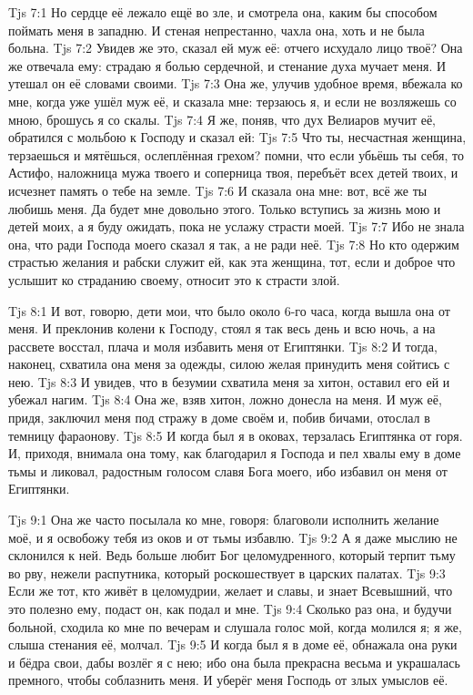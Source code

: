 \vs Tjs 7:1
Но сердце её лежало ещё во зле, и смотрела она,
каким бы способом поймать меня в западню.
И стеная непрестанно, чахла она,
хоть и не была больна.
\vs Tjs 7:2
Увидев же это, сказал ей муж её:
отчего исхудало лицо твоё?
Она же отвечала ему:
страдаю я болью сердечной, и стенание духа мучает меня.
И утешал он её словами своими.
\vs Tjs 7:3
Она же, улучив удобное время, вбежала ко мне,
когда уже ушёл муж её, и сказала мне:
терзаюсь я, и если не возляжешь со мною, брошусь я со скалы.
\vs Tjs 7:4
Я же, поняв, что дух Велиаров мучит её,
обратился с мольбою к Господу и сказал ей:
\vs Tjs 7:5
Что ты, несчастная женщина, терзаешься и мятёшься,
ослеплённая грехом?
помни, что если убьёшь ты себя,
то Астифо, наложница мужа твоего и соперница твоя,
перебъёт всех детей твоих,
и исчезнет память о тебе на земле.
\vs Tjs 7:6
И сказала она мне: вот, всё же ты любишь меня.
Да будет мне довольно этого.
Только вступись за жизнь мою и детей моих,
а я буду ожидать, пока не услажу страсти моей.
\vs Tjs 7:7
Ибо не знала она, что ради Господа моего сказал я так,
а не ради неё.
\vs Tjs 7:8
Но кто одержим страстью желания и рабски служит ей,
как эта женщина, тот, если и доброе что услышит
ко страданию своему, относит это к страсти злой.

\vs Tjs 8:1
И вот, говорю, дети мои, что было около 6-го часа,
когда вышла она от меня.
И преклонив колени к Господу,
стоял я так весь день и всю ночь,
а на рассвете восстал,
плача и моля избавить меня от Египтянки.
\vs Tjs 8:2
И тогда, наконец, схватила она меня за одежды,
силою желая принудить меня сойтись с нею.
\vs Tjs 8:3
И увидев, что в безумии схватила меня за хитон,
оставил его ей и убежал нагим.
\vs Tjs 8:4
Она же, взяв хитон, ложно донесла на меня.
И муж её, придя, заключил меня под стражу
в доме своём и, побив бичами, отослал в темницу фараонову.
\vs Tjs 8:5
И когда был я в оковах, терзалась Египтянка от горя.
И, приходя, внимала она тому, как благодарил
я Господа и пел хвалы ему в доме тьмы и ликовал,
радостным голосом славя Бога моего, ибо избавил
он меня от Египтянки.

\vs Tjs 9:1
Она же часто посылала ко мне, говоря:
благоволи исполнить желание моё,
и я освобожу тебя из оков и от тьмы избавлю.
\vs Tjs 9:2
А я даже мыслию не склонился к ней.
Ведь больше любит Бог целомудренного,
который терпит тьму во рву,
нежели распутника, который роскошествует в царских палатах.
\vs Tjs 9:3
Если же тот, кто живёт в целомудрии, желает и славы,
и знает Всевышний, что это полезно ему,
подаст он, как подал и мне.
\vs Tjs 9:4
Сколько раз она, и будучи больной,
сходила ко мне по вечерам и слушала голос мой,
когда молился я;
я же, слыша стенания её, молчал.
\vs Tjs 9:5
И когда был я в доме её, обнажала она руки и бёдра свои,
дабы возлёг я с нею;
ибо она была прекрасна весьма и украшалась премного,
чтобы соблазнить меня.
И уберёг меня Господь от злых умыслов её.

